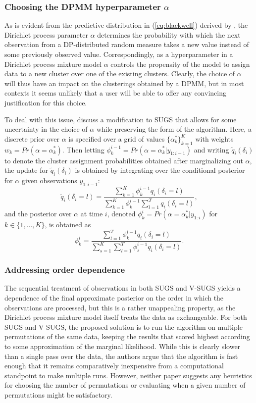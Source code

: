 \documentclass{uwstat572}
\begin{document}
\subsubsection{Choosing the DPMM hyperparameter $\alpha$}

As is evident from the predictive distribution in (\ref{eq:blackwell}) derived by \cite{blackwell}, the Dirichlet process parameter $\alpha$ determines the probability with which the next observation from a DP-distributed random measure takes a new value instead of some previously observed value. Correspondingly, as a hyperparameter in a Dirichlet process mixture model $\alpha$ controls the propensity of the model to assign data to a new cluster over one of the existing clusters. Clearly, the choice of $\alpha$ will thus have an impact on the clusterings obtained by a DPMM, but in most contexts it seems unlikely that a user will be able to offer any convincing justification for this choice. 

To deal with this issue, \cite{wang} discuss a modification to SUGS that allows for some uncertainty in the choice of $\alpha$ while preserving the form of the algorithm. Here, a discrete prior over $\alpha$ is specified over a grid of values $\{\alpha^*_k\}_{k=1}^K$ with weights $w_k = Pr(\alpha = \alpha_k^*)$. Then letting $\phi_k^{i-1} = Pr(\alpha = \alpha_k^* | y_{1:i-1})$ and writing $\tilde{q}_i(\delta_i)$ to denote the cluster assignment probabilities obtained after marginalizing out $\alpha$, the update for $\tilde{q}_i(\delta_i)$ is obtained by integrating over the conditional posterior for $\alpha$ given observations $y_{1:i-1}$:
$$ \tilde{q}_i(\delta_i = l) = \frac{\sum_{k=1}^K \phi_k^{i-1} q_i(\delta_i = l)}{\sum_{k=1}^K \phi_k^{i-1} \sum_{l=1}^T q_i(\delta_i = l)}, $$
and the posterior over $\alpha$ at time $i$, denoted $\phi_k^{i} = Pr(\alpha = \alpha_k^* | y_{1:i})$ for $k \in \{1,...,K\}$, is obtained as 
$$ \phi_k^{i} = \frac{\sum_{l=1}^T \phi_k^{i-1} q_i(\delta_i = l)}{\sum_{s=1}^K \sum_{l=1}^T \phi_s^{i-1} q_i(\delta_i = l)}.$$

\subsubsection{Addressing order dependence}

The sequential treatment of observations in both SUGS and V-SUGS yields a dependence of the final approximate posterior on the order in which the observations are processed, but this is a rather unappealing property, as the Dirichlet process mixture model itself treats the data as exchangeable. For both SUGS and V-SUGS, the proposed solution is to run the algorithm on multiple permutations of the same data, keeping the results that scored highest according to some approximation of the marginal likelihood. While this is clearly slower than a single pass over the data, the authors argue that the algorithm is fast enough that it remains comparatively inexpensive from a computational standpoint to make multiple runs. However, neither paper suggests any heuristics for choosing the number of permutations or evaluating when a given number of permutations might be satisfactory.
\end{document}

